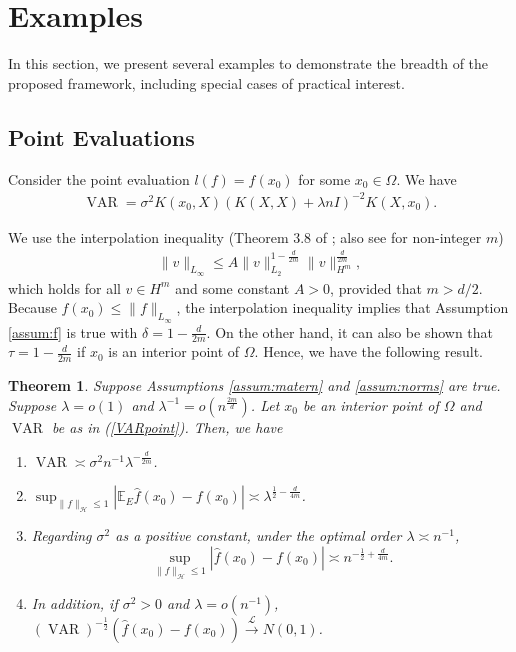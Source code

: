 \documentclass[12pt]{article}
\theoremstyle{plain}
\newtheorem{theorem}{Theorem}
\theoremstyle{remark}
\begin{document}
\section{Examples}\label{sec:examples}
In this section, we present several examples to demonstrate the breadth of the proposed framework, including special cases of practical interest. 

\subsection{Point Evaluations}\label{sec:point}
Consider the point evaluation $l(f)=f(x_0)$ for some $x_0\in\Omega$. We have
\begin{eqnarray}\label{VARpoint}
    \operatorname{VAR}=\sigma^2 K(x_0,X)(K(X,X)+\lambda n I)^{-2}K(X,x_0).
\end{eqnarray}

We use the interpolation inequality (Theorem 3.8 of \cite{adams2003sobolev}; also see \cite{brezis2019sobolev} for non-integer $m$)
\begin{eqnarray}\label{interpolation}
    \|v\|_{L_\infty}\leq A\|v\|^{1-\frac{d}{2m}}_{L_2}\|v\|^{\frac{d}{2m}}_{H^m},
\end{eqnarray}
which holds for all $v\in H^m$ and some constant $A>0$, provided that $m>d/2$. Because $f(x_0)\leq \|f\|_{L_\infty}$, the interpolation inequality implies that Assumption \ref{assum:f} is true with $\delta=1-\frac{d}{2m}$. On the other hand, it can also be shown that $\tau=1-\frac{d}{2m}$ if $x_0$ is an interior point of $\Omega$.
Hence, we have the following result.

\begin{theorem}\label{Th:point}
    Suppose Assumptions \ref{assum:matern} and \ref{assum:norms} are true. Suppose $\lambda=o(1)$ and $\lambda^{-1}=o(n^{\frac{2m}{d}})$. Let $x_0$ be an interior point of $\Omega$ and $\operatorname{VAR}$ be as in (\ref{VARpoint}). Then, we have
    \begin{enumerate}
        \item $\operatorname{VAR}\asymp \sigma^2 n^{-1}\lambda^{-\frac{d}{2m}}$.
        \item $\sup_{\|f\|_\mathcal{H}\leq 1}\left|\mathbb{E}_E\hat{f}(x_0)-f(x_0)\right| \asymp \lambda^{\frac{1}{2}-\frac{d}{4m}}$.
        \item Regarding $\sigma^2$ as a positive constant, under the optimal order $\lambda\asymp n^{-1}$, 
        \[\sup_{\|f\|_\mathcal{H}\leq 1}|\hat{f}(x_0)-f(x_0)|\asymp n^{-\frac{1}{2}+\frac{d}{4m}}.\]
        \item In addition, if $\sigma^2>0$ and $\lambda=o(n^{-1})$, $(\operatorname{VAR})^{-\frac{1}{2}}(\hat{f}(x_0)-f(x_0))\xrightarrow{\mathscr{L}}N(0,1)$.
    \end{enumerate}
\end{theorem}
\end{document}
